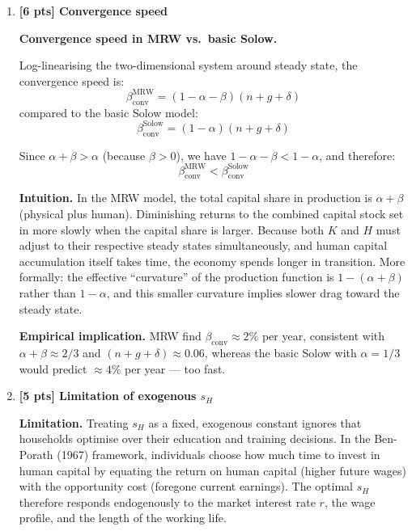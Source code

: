 \documentclass[a4paper,11pt]{article}
\begin{document}
\begin{enumerate}[label=\textbf{(\arabic*)},leftmargin=*]
\bigskip

\item \textbf{[6 pts] Convergence speed}

\begin{answerbox}
\textbf{Convergence speed in MRW vs.\ basic Solow.}

Log-linearising the two-dimensional system around steady state, the convergence speed is:
\[
  \beta_{\mathrm{conv}}^{\mathrm{MRW}} = (1-\alpha-\beta)(n+g+\delta)
\]
compared to the basic Solow model:
\[
  \beta_{\mathrm{conv}}^{\mathrm{Solow}} = (1-\alpha)(n+g+\delta)
\]

Since $\alpha+\beta > \alpha$ (because $\beta > 0$), we have $1-\alpha-\beta < 1-\alpha$, and therefore:
\[
  \beta_{\mathrm{conv}}^{\mathrm{MRW}} < \beta_{\mathrm{conv}}^{\mathrm{Solow}}
\]

\textbf{Intuition.} In the MRW model, the total capital share in production is $\alpha + \beta$ (physical plus human). Diminishing returns to the combined capital stock set in more slowly when the capital share is larger. Because both $K$ and $H$ must adjust to their respective steady states simultaneously, and human capital accumulation itself takes time, the economy spends longer in transition. More formally: the effective ``curvature'' of the production function is $1 - (\alpha+\beta)$ rather than $1-\alpha$, and this smaller curvature implies slower drag toward the steady state.

\textbf{Empirical implication.} MRW find $\beta_{\mathrm{conv}} \approx 2\%$ per year, consistent with $\alpha+\beta \approx 2/3$ and $(n+g+\delta) \approx 0.06$, whereas the basic Solow with $\alpha = 1/3$ would predict $\approx 4\%$ per year --- too fast.
\end{answerbox}

\bigskip

\item \textbf{[5 pts] Limitation of exogenous $s_H$}

\begin{answerbox}
\textbf{Limitation.} Treating $s_H$ as a fixed, exogenous constant ignores that households optimise over their education and training decisions. In the Ben-Porath (1967) framework, individuals choose how much time to invest in human capital by equating the return on human capital (higher future wages) with the opportunity cost (foregone current earnings). The optimal $s_H$ therefore responds endogenously to the market interest rate $r$, the wage profile, and the length of the working life.


\end{answerbox}
\end{enumerate}
\end{document}
